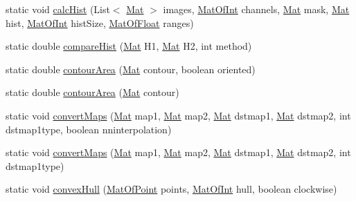 \begin{DoxyCompactItemize}
\item 
static void \mbox{\hyperlink{classorg_1_1opencv_1_1imgproc_1_1_imgproc_a6878eca2d6d70089c17a1c7b8125e544}{calc\+Hist}} (List$<$ \mbox{\hyperlink{classorg_1_1opencv_1_1core_1_1_mat}{Mat}} $>$ images, \mbox{\hyperlink{classorg_1_1opencv_1_1core_1_1_mat_of_int}{Mat\+Of\+Int}} channels, \mbox{\hyperlink{classorg_1_1opencv_1_1core_1_1_mat}{Mat}} mask, \mbox{\hyperlink{classorg_1_1opencv_1_1core_1_1_mat}{Mat}} hist, \mbox{\hyperlink{classorg_1_1opencv_1_1core_1_1_mat_of_int}{Mat\+Of\+Int}} hist\+Size, \mbox{\hyperlink{classorg_1_1opencv_1_1core_1_1_mat_of_float}{Mat\+Of\+Float}} ranges)
\item 
static double \mbox{\hyperlink{classorg_1_1opencv_1_1imgproc_1_1_imgproc_a5b3dd3404f725b0d9c7a5fa249ffd855}{compare\+Hist}} (\mbox{\hyperlink{classorg_1_1opencv_1_1core_1_1_mat}{Mat}} H1, \mbox{\hyperlink{classorg_1_1opencv_1_1core_1_1_mat}{Mat}} H2, int method)
\item 
static double \mbox{\hyperlink{classorg_1_1opencv_1_1imgproc_1_1_imgproc_a0b9b82e8b2461a102788628c8b86d1a1}{contour\+Area}} (\mbox{\hyperlink{classorg_1_1opencv_1_1core_1_1_mat}{Mat}} contour, boolean oriented)
\item 
static double \mbox{\hyperlink{classorg_1_1opencv_1_1imgproc_1_1_imgproc_a9d6a5977b0691eb9736af8151e2bbc61}{contour\+Area}} (\mbox{\hyperlink{classorg_1_1opencv_1_1core_1_1_mat}{Mat}} contour)
\item 
static void \mbox{\hyperlink{classorg_1_1opencv_1_1imgproc_1_1_imgproc_a03418d25b2a22395f42e32d869937f95}{convert\+Maps}} (\mbox{\hyperlink{classorg_1_1opencv_1_1core_1_1_mat}{Mat}} map1, \mbox{\hyperlink{classorg_1_1opencv_1_1core_1_1_mat}{Mat}} map2, \mbox{\hyperlink{classorg_1_1opencv_1_1core_1_1_mat}{Mat}} dstmap1, \mbox{\hyperlink{classorg_1_1opencv_1_1core_1_1_mat}{Mat}} dstmap2, int dstmap1type, boolean nninterpolation)
\item 
static void \mbox{\hyperlink{classorg_1_1opencv_1_1imgproc_1_1_imgproc_ab36cb67b988ea831009909fb126efc3d}{convert\+Maps}} (\mbox{\hyperlink{classorg_1_1opencv_1_1core_1_1_mat}{Mat}} map1, \mbox{\hyperlink{classorg_1_1opencv_1_1core_1_1_mat}{Mat}} map2, \mbox{\hyperlink{classorg_1_1opencv_1_1core_1_1_mat}{Mat}} dstmap1, \mbox{\hyperlink{classorg_1_1opencv_1_1core_1_1_mat}{Mat}} dstmap2, int dstmap1type)
\item 
static void \mbox{\hyperlink{classorg_1_1opencv_1_1imgproc_1_1_imgproc_aca40be72d91322b2caa2e37b5da190e6}{convex\+Hull}} (\mbox{\hyperlink{classorg_1_1opencv_1_1core_1_1_mat_of_point}{Mat\+Of\+Point}} points, \mbox{\hyperlink{classorg_1_1opencv_1_1core_1_1_mat_of_int}{Mat\+Of\+Int}} hull, boolean clockwise)

\end{DoxyCompactItemize}
